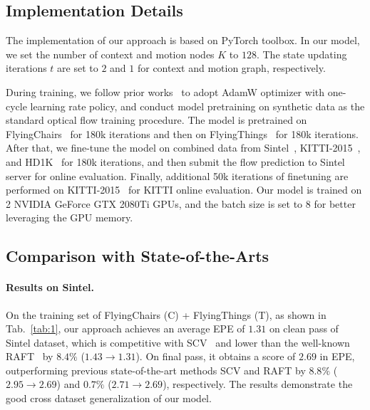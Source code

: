 \documentclass[letterpaper]{article} %
\begin{document}
\subsection{Implementation Details}

The implementation of our approach is based on PyTorch toolbox. In our model, we set the number of context and motion nodes $K$ to $128$. The state updating iterations $t$ are set to $2$ and $1$ for context and motion graph, respectively. 

During training, we follow prior works~\cite{Teed2020RAFTRA, Jiang2021LearningTE} to adopt AdamW optimizer with one-cycle learning rate policy, and conduct model pretraining on synthetic data as the standard optical flow training procedure. The model is pretrained on FlyingChairs~\cite{Dosovitskiy2015FlowNetLO} for 180k iterations and then on FlyingThings~\cite{Mayer2016ALD} for 180k iterations. After that, we fine-tune the model on combined data from Sintel~\cite{Butler2012}, KITTI-2015~\cite{KITTI_2015}, and HD1K~\cite{Kondermann2016TheHB} for 180k iterations, and then submit the flow prediction to Sintel server for online evaluation. Finally, additional 50k iterations of finetuning are performed on KITTI-2015~\cite{KITTI_2015} for KITTI online evaluation. Our model is trained on 2 NVIDIA GeForce GTX 2080Ti GPUs, and the batch size is set to $8$ for better leveraging the GPU memory.

\subsection{Comparison with State-of-the-Arts}

\paragraph{Results on Sintel.}

On the training set of FlyingChairs (C) + FlyingThings (T), as shown in Tab.~\ref{tab:1}, our approach achieves an average EPE of $1.31$ on clean pass of Sintel dataset, which is competitive with SCV~\cite{Jiang2021LearningOF} and lower than the well-known RAFT~\cite{Teed2020RAFTRA} by $8.4\%$ ($1.43 \rightarrow 1.31$). On final pass, it obtains a score of $2.69$ in EPE, outperforming previous state-of-the-art methods SCV and RAFT by $8.8\%$ ($2.95 \rightarrow 2.69$) and $0.7\%$ ($2.71 \rightarrow 2.69$), respectively. The results demonstrate the good cross dataset generalization of our model.
\end{document}
